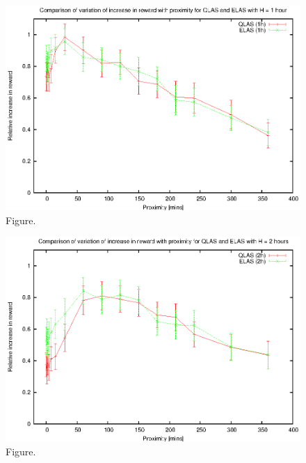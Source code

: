 \documentclass[12pt,a4paper]{article}
\begin{document}
\clearpage
\begin{figure}[htbp]
 \begin{center}
  \includegraphics[scale=1.0, angle=0]{figures/evplot_1.eps}
 \end{center}
  \caption[Figure.]
{Figure.}
\end{figure}
\clearpage
\begin{figure}[htbp]
 \begin{center}
  \includegraphics[scale=1.0, angle=0]{figures/evplot_2.eps}
 \end{center}
  \caption[Figure.]
{Figure.}
\end{figure}
\clearpage
\end{document}
